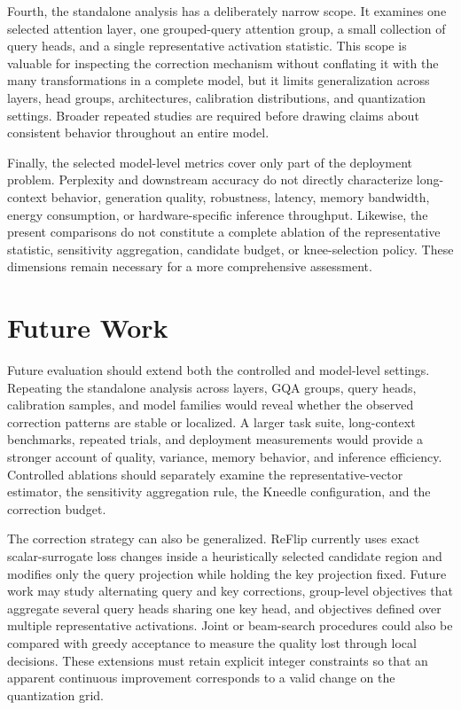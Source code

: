\documentclass[../main.tex]{subfiles}
\begin{document}
Fourth, the standalone analysis has a deliberately narrow scope. It examines one selected attention layer, one grouped-query attention group, a small collection of query heads, and a single representative activation statistic. This scope is valuable for inspecting the correction mechanism without conflating it with the many transformations in a complete model, but it limits generalization across layers, head groups, architectures, calibration distributions, and quantization settings. Broader repeated studies are required before drawing claims about consistent behavior throughout an entire model.

Finally, the selected model-level metrics cover only part of the deployment problem. Perplexity and downstream accuracy do not directly characterize long-context behavior, generation quality, robustness, latency, memory bandwidth, energy consumption, or hardware-specific inference throughput. Likewise, the present comparisons do not constitute a complete ablation of the representative statistic, sensitivity aggregation, candidate budget, or knee-selection policy. These dimensions remain necessary for a more comprehensive assessment.

\section{Future Work}

Future evaluation should extend both the controlled and model-level settings. Repeating the standalone analysis across layers, GQA groups, query heads, calibration samples, and model families would reveal whether the observed correction patterns are stable or localized. A larger task suite, long-context benchmarks, repeated trials, and deployment measurements would provide a stronger account of quality, variance, memory behavior, and inference efficiency. Controlled ablations should separately examine the representative-vector estimator, the sensitivity aggregation rule, the Kneedle configuration, and the correction budget.

The correction strategy can also be generalized. ReFlip currently uses exact scalar-surrogate loss changes inside a heuristically selected candidate region and modifies only the query projection while holding the key projection fixed. Future work may study alternating query and key corrections, group-level objectives that aggregate several query heads sharing one key head, and objectives defined over multiple representative activations. Joint or beam-search procedures could also be compared with greedy acceptance to measure the quality lost through local decisions. These extensions must retain explicit integer constraints so that an apparent continuous improvement corresponds to a valid change on the quantization grid.
\end{document}
